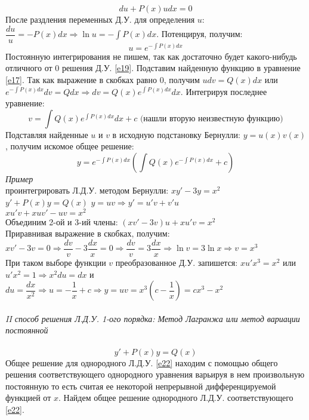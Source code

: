 \documentclass{article}
\numberwithin{equation}{section}
\begin{document}
\begin{equation}\label{e19}
du+P(x)udx=0
\end{equation}
После раздления переменных Д.У. для определения $u$: $\dfrac{du}{u}=-P(x)dx\Rightarrow\ln u=-\int P(x)dx$. Потенцируя, получим:
\begin{equation}\label{e33}
u=e^{-\int P(x)dx}
\end{equation}
Постоянную интегрирования не пишем, так как достаточно будет какого-нибудь отличного от 0 решения Д.У. \eqref{e19}. Подставим найденную функцию в уравнение \eqref{e17}. Так как выражение в скобках равно 0, получим $udv=Q(x)dx$ или $e^{-\int P(x)dx}dv=Qdx\Rightarrow dv=Q(x)e^{\int P(x)dx}dx$. Интегрируя последнее уравнение:
\begin{equation}\label{e20}
v=\int Q(x)e^{\int P(x)dx}dx+c\mbox{ (нашли вторую неизвестную функцию)}
\end{equation}
Подставляя найденные $u$ и $v$ в исходную подстановку Бернулли: $y=u(x)v(x)$, получим искомое общее решение:
\begin{equation}\label{e21}
y=e^{-\int P(x)dx}(\int Q(x)e^{-\int P(x)dx}+c)
\end{equation}
\textit{Пример}\\
проинтегрировать Л.Д.У. методом Бернулли: $xy'-3y=x^2$\\
$y'+P(x)y=Q(x)$ $y=uv\Rightarrow y'=u'v+v'u$\\
$xu'v+xuv'-uv=x^2$\\
Объединим 2-ой и 3-ий члены: $(xv'-3v)u+xu'v=x^2$\\
Приравнивая выражение в скобках, получим: $xv'-3v=0\Rightarrow\dfrac{dv}{v}-3\dfrac{dx}{x}=0\Rightarrow\dfrac{dv}{v}=3\dfrac{dx}{x}\Rightarrow\ln v=3\ln x\Rightarrow v=x^3$\\
При таком выборе функции $v$ преобразованное Д.У. запишется: $xu'x^3=x^2$ или $u'x^2=1\Rightarrow x^2du=dx$ и $du=\dfrac{dx}{x^2}\Rightarrow u=-\dfrac{1}{x}+c\Rightarrow y=uv=x^3(c-\dfrac{1}{x})=cx^3-x^2$\\\\
\textit{II способ решения Л.Д.У. 1-ого порядка: Метод Лагранжа или метод вариации постоянной}\\\\
\begin{equation}\label{e22}
y'+P(x)y=Q(x)
\end{equation}
Общее решение для однородного Л.Д.У. \eqref{e22} находим с помощью общего решения соответствующего однородного уравнения варьируя в нем произвольную постоянную то есть считая ее некоторой непрерывной дифференцируемой функцией от $x$. Найдем общее решение однородного Л.Д.У. соответствующего \eqref{e22}.
\end{document}
